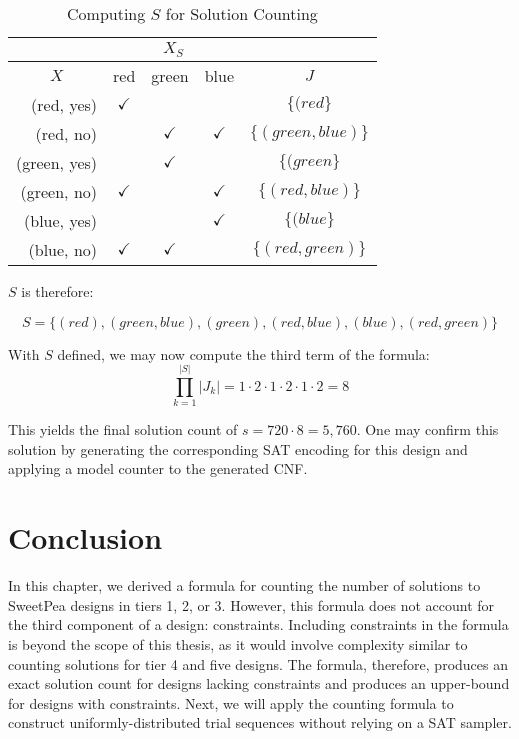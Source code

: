 \begin{table}[b]
  \centering
  \caption{Computing $S$ for Solution Counting}
\begin{tabular}{r|c|c|c|c}
\cline{2-4}
\multicolumn{1}{c|}{}              & \multicolumn{3}{c|}{$X_S$}                 & \multicolumn{1}{l}{}                     \\ \hline
\multicolumn{1}{|c|}{$X$}          & red          & green        & blue         & \multicolumn{1}{c|}{$J$}                 \\ \hline
\multicolumn{1}{|r|}{(red, yes)}   & $\checkmark$ &              &              & \multicolumn{1}{c|}{$\{(red\}$}         \\ \hline
\multicolumn{1}{|r|}{(red, no)}    &              & $\checkmark$ & $\checkmark$ & \multicolumn{1}{c|}{$\{(green, blue)\}$} \\ \hline
\multicolumn{1}{|r|}{(green, yes)} &              & $\checkmark$ &              & \multicolumn{1}{c|}{$\{(green\}$}       \\ \hline
\multicolumn{1}{|r|}{(green, no)}  & $\checkmark$ &              & $\checkmark$ & \multicolumn{1}{c|}{$\{(red, blue)\}$}   \\ \hline
\multicolumn{1}{|r|}{(blue, yes)}  &              &              & $\checkmark$ & \multicolumn{1}{c|}{$\{(blue\}$}        \\ \hline
\multicolumn{1}{|r|}{(blue, no)}   & $\checkmark$ & $\checkmark$ &              & \multicolumn{1}{c|}{$\{(red, green)\}$}  \\ \hline
\end{tabular}
\label{tab:example_s}%
\end{table}

$S$ is therefore:

\[
S = \{(red), (green, blue), (green), (red, blue), (blue), (red, green)\}
\]

With $S$ defined, we may now compute the third term of the formula:
\[
    \prod_{k=1}^{|S|} |J_k| = 1 \cdot 2 \cdot 1 \cdot 2 \cdot 1 \cdot 2 = 8
\]

This yields the final solution count of $s = 720 \cdot 8 = 5,760$. One may confirm this solution by generating the corresponding SAT encoding for this design and applying a model counter to the generated CNF.

\section{Conclusion}

In this chapter, we derived a formula for counting the number of solutions to SweetPea designs in tiers 1, 2, or 3. However, this formula does not account for the third component of a design: constraints. Including constraints in the formula is beyond the scope of this thesis, as it would involve complexity similar to counting solutions for tier 4 and five designs. The formula, therefore, produces an exact solution count for designs lacking constraints and produces an upper-bound for designs with constraints. Next, we will apply the counting formula to construct uniformly-distributed trial sequences without relying on a SAT sampler.

